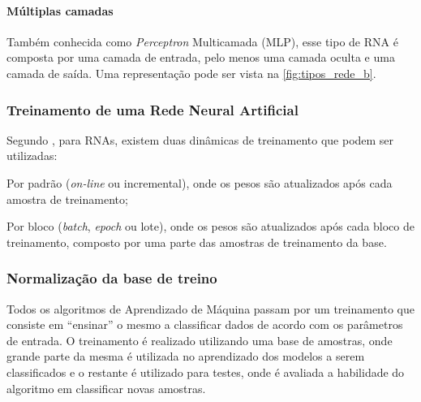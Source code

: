 \documentclass[12pt,oneside,a4paper,chapter=TITLE,section=TITLE,sumario
		=tradicional]{abntex2}
\begin{document}
		\paragraph{Múltiplas camadas}
		
		Também conhecida como \textit{Perceptron} Multicamada (MLP), esse tipo de RNA é composta por uma camada de entrada, pelo menos uma camada oculta e uma camada de saída. Uma representação pode ser vista na \autoref{fig:tipos_rede_b}.
						
		\begin{figure}[H]
			\hfil
		\end{figure}
		
		
		
		\subsubsection{Treinamento de uma Rede Neural Artificial}
		\label{sec:treinamento}
		Segundo , para RNAs, existem duas dinâmicas de treinamento que podem ser utilizadas:
		
		\begin{lista}
			\item Por padrão (\textit{on-line} ou incremental), onde os pesos são atualizados após cada amostra de treinamento;
			
			\item Por bloco (\textit{batch}, \textit{epoch} ou lote), onde os pesos são atualizados após cada bloco de treinamento, composto por uma parte das amostras de treinamento da base. 
		\end{lista}
		
		\subsubsection {Normalização da base de treino}	
		\label{sec:padronizacao}
		Todos os algoritmos de Aprendizado de Máquina passam por um  treinamento que consiste em ``ensinar'' o mesmo a classificar dados de acordo com os parâmetros de entrada. O treinamento é realizado utilizando uma base de amostras, onde grande parte da mesma é utilizada no aprendizado dos modelos a serem classificados e o restante é utilizado para testes, onde é avaliada a habilidade do algoritmo em classificar novas amostras.
		
\end{document}
